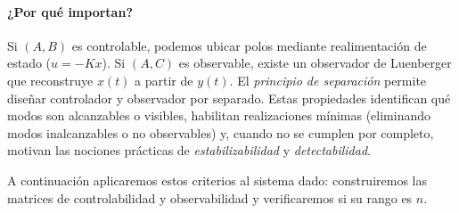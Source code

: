 \documentclass[
  11pt,
  letterpaper,
   addpoints,
   answers
  ]{exam}
\begin{document}
\begin{questions}
\begin{solution}
\paragraph{¿Por qué importan?}
Si $(A,B)$ es controlable, podemos ubicar polos mediante realimentación de estado ($u=-Kx$). Si $(A,C)$
es observable, existe un observador de Luenberger que reconstruye $x(t)$ a partir de $y(t)$. El
\emph{principio de separación} permite diseñar controlador y observador por separado. Estas propiedades
identifican qué modos son alcanzables o visibles, habilitan realizaciones mínimas (eliminando modos
inalcanzables o no observables) y, cuando no se cumplen por completo, motivan las nociones prácticas de
\emph{estabilizabilidad} y \emph{detectabilidad}.

A continuación aplicaremos estos criterios al sistema dado: construiremos las matrices de
controlabilidad y observabilidad y verificaremos si su rango es $n$.


\end{solution}
\end{questions}
\end{document}
